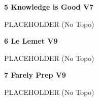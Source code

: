 \begin{multicols*}{2}
					\label{rt:Knowledge is Good} \colorbox{Goldenrod!50}{\textbf{5 Knowledge is Good V7  }}
					\begin{adjustwidth}{1cm}{}
					PLACEHOLDER
						\newline (No Topo) 
					\end{adjustwidth}
					\label{rt:Le Lemet} \colorbox{Goldenrod!50}{\textbf{6 Le Lemet V9  }}
					\begin{adjustwidth}{1cm}{}
					PLACEHOLDER
						\newline (No Topo) 
					\end{adjustwidth}
					\label{rt:Farely Prep} \colorbox{Goldenrod!50}{\textbf{7 Farely Prep V9  }}
					\begin{adjustwidth}{1cm}{}
					PLACEHOLDER
						\newline (No Topo) 
					\end{adjustwidth}
\end{multicols*}
\clearpage